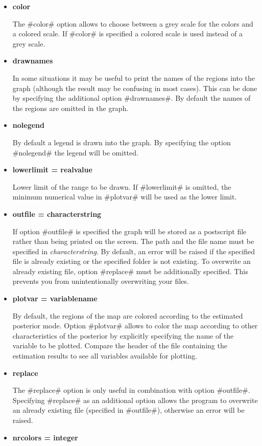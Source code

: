 \begin{itemize}
\item {\bf color}

The #color# option allows to choose between a grey scale for the
colors and a colored scale. If #color# is specified a colored
scale is used instead of a grey scale. \item {\bf drawnames}

In some situations it may be useful to print the names of the
regions into the graph (although the result may be confusing in
most cases). This can be done by specifying the additional option
#drawnames#. By default the names of the regions are omitted in
the graph. \item {\bf nolegend}

By default a legend is drawn into the graph. By specifying the
option #nolegend# the legend will be omitted. \item {\bf
lowerlimit = realvalue}

Lower limit of the range to be drawn. If #lowerlimit# is omitted,
the minimum numerical value in #plotvar# will be used as the
lower limit. \item {\bf outfile = characterstring}

If option #outfile# is specified the graph will be stored as a
postscript file rather than being printed on the screen. The path
and the file name must be specified in {\em characterstring}. By
default, an error will be raised if the specified file  is already
existing or the specified folder is not existing. To overwrite  an
already existing file, option #replace# must be additionally
specified. This prevents you from unintentionally overwriting your
files.
\item {\bf plotvar = variablename}

By default, the regions of the map are colored according to the
estimated posterior mode. Option #plotvar# allows to color the map
according to other characteristics of the posterior by explicitly
specifying the name of the variable to be plotted. Compare the
header of the file containing the estimation results to see all
variables available for plotting. \item {\bf replace}

The #replace# option is only useful in combination with option
#outfile#. Specifying #replace# as an additional option allows the
program to overwrite an already existing file (specified in
#outfile#), otherwise an error will be raised. \item {\bf nrcolors
= integer}


\end{itemize}
